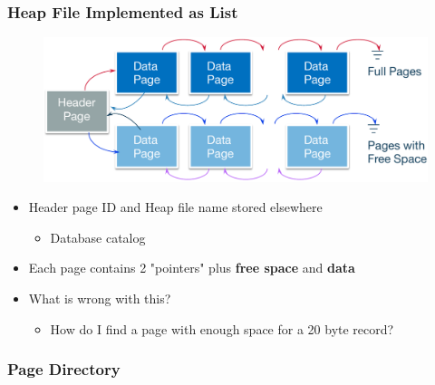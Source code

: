 \begin{frame}[fragile]
\begin{columns}[c]
\end{columns}

\end{frame}


\begin{frame}[fragile]
	\frametitle{Heap File Implemented as List}
	\begin{figure}
		\includegraphics[width=.7\linewidth]{figs/dbfile-heapfile2.pdf}
	\end{figure}
	\begin{itemize}
		\item Header page ID and Heap file name stored elsewhere
		\begin{itemize}
			\item Database catalog
		\end{itemize}
		\item Each page contains 2 "pointers" plus \textbf{free space} and \textbf{data}
		\item What is wrong with this?
		\begin{itemize}
			\item How do I find a page with enough space for a 20 byte record?
		\end{itemize}
	\end{itemize}
\end{frame}

\subsubsection{Page Directory}


